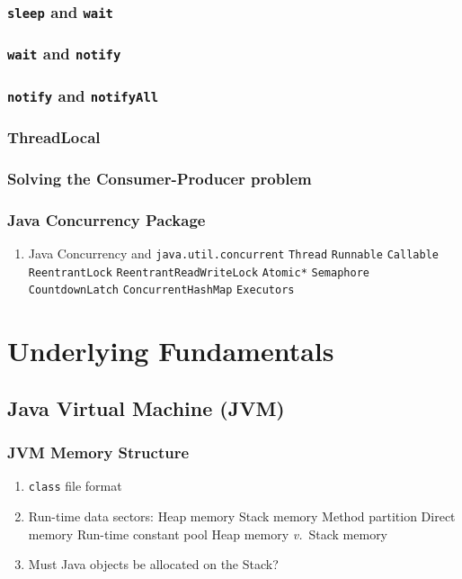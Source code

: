 \documentclass[11pt, twocolumn]{article}
\newcommand{\versus}{\textit{v.}\ }
\begin{document}
\subsubsection{\texttt{sleep} and \texttt{wait}}

\subsubsection{\texttt{wait} and \texttt{notify}}

\subsubsection{\texttt{notify} and \texttt{notifyAll}}

\subsubsection{ThreadLocal}

\subsubsection{Solving the Consumer-Producer problem}

\subsubsection{Java Concurrency Package}
\begin{enumerate}
	\item Java Concurrency and \texttt{java.util.concurrent}
	\subitem \texttt{Thread}
	\subitem \texttt{Runnable}
	\subitem \texttt{Callable}
	\subitem \texttt{ReentrantLock}
	\subitem \texttt{ReentrantReadWriteLock}
	\subitem \texttt{Atomic*}
	\subitem \texttt{Semaphore}
	\subitem \texttt{CountdownLatch}
	\subitem \texttt{ConcurrentHashMap}
	\subitem \texttt{Executors}
\end{enumerate}

\section{Underlying Fundamentals}

\subsection{Java Virtual Machine (JVM)}

\subsubsection{JVM Memory Structure}
\begin{enumerate}
	\item \texttt{class} file format
	\item Run-time data sectors:
	\subitem Heap memory
	\subitem Stack memory
	\subitem Method partition
	\subitem Direct memory
	\subitem Run-time constant pool
	\subitem Heap memory \versus Stack memory
	\item Must Java objects be allocated on the Stack?
\end{enumerate}
\end{document}
